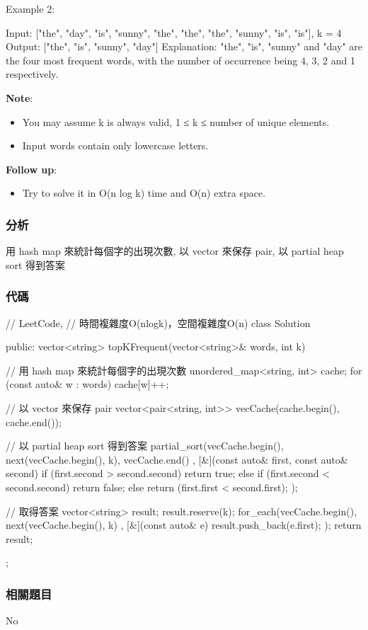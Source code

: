 Example 2:
\begin{Code}
Input: ["the", "day", "is", "sunny", "the", "the", "the", "sunny", "is", "is"], k = 4
Output: ["the", "is", "sunny", "day"]
Explanation: "the", "is", "sunny" and "day" are the four most frequent words,
    with the number of occurrence being 4, 3, 2 and 1 respectively.
\end{Code}

\textbf{Note}:
\begin{itemize}
\item{You may assume k is always valid, 1 ≤ k ≤ number of unique elements.}
\item{Input words contain only lowercase letters.}
\end{itemize}

\textbf{Follow up}:
\begin{itemize}
\item{Try to solve it in O(n log k) time and O(n) extra space.}
\end{itemize}



\subsubsection{分析}
用 hash map 來統計每個字的出現次數, 以 vector 來保存 pair, 以 partial heap sort 得到答案

\subsubsection{代碼}
\begin{Code}
// LeetCode,
// 時間複雜度O(nlogk)，空間複雜度O(n)
class Solution {
public:
    vector<string> topKFrequent(vector<string>& words, int k) {
        // 用 hash map 來統計每個字的出現次數
        unordered_map<string, int> cache;
        for (const auto& w : words) cache[w]++;

        // 以 vector 來保存 pair
        vector<pair<string, int>> vecCache(cache.begin(), cache.end());

        // 以 partial heap sort 得到答案
        partial_sort(vecCache.begin(), next(vecCache.begin(), k), vecCache.end()
                     , [&](const auto& first, const auto& second)
                     {
                         if (first.second > second.second)
                             return true;
                         else if (first.second < second.second)
                             return false;
                         else
                         {
                             return (first.first < second.first);
                         }
                     });

        // 取得答案
        vector<string> result; result.reserve(k);
        for_each(vecCache.begin(), next(vecCache.begin(), k)
                , [&](const auto& e)
                 {
                     result.push_back(e.first);
                 });
        return result;
    }
};
\end{Code}
\subsubsection{相關題目}
No
